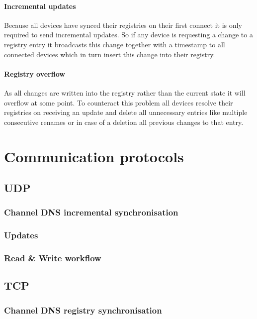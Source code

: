 \documentclass[a4paper]{article}
\begin{document}
        \paragraph{Incremental updates}  Because all devices have synced their registries on their first connect it is
            only required to send incremental updates. So if any device is requesting a change to a registry entry it
            broadcasts this change together with a timestamp to all connected devices which in turn insert this change
            into their registry.
        \paragraph{Registry overflow} As all changes are written into the registry rather than the current state it will
            overflow at some point. To counteract this problem all devices resolve their registries on receiving an
            update and delete all unnecessary entries like multiple consecutive renames or in case of a deletion all
            previous changes to that entry.
    \section{Communication protocols}
        \subsection{UDP}
            \subsubsection{Channel DNS incremental synchronisation}
            \subsubsection{Updates}
            \subsubsection{Read \& Write workflow}
        \subsection{TCP}
            \subsubsection{Channel DNS registry synchronisation}
\end{document}
